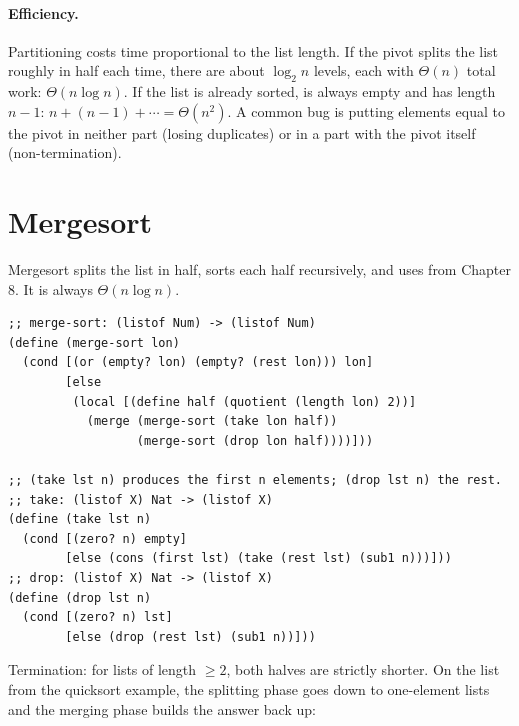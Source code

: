 \paragraph{Efficiency.} Partitioning costs time proportional to the list length.
If the pivot splits the list roughly in half each time, there are about
$\log_2 n$ levels, each with $\Theta(n)$ total work: $\Theta(n \log n)$. If the
list is already sorted,  is always empty and  has
length $n-1$: $n + (n-1) + \cdots = \Theta(n^2)$. A common bug is putting
elements equal to the pivot in neither part (losing duplicates) or in a part
with the pivot itself (non-termination).

\section{Mergesort}
Mergesort splits the list in half, sorts each half recursively, and uses
 from Chapter 8. It is always $\Theta(n \log n)$.
\begin{lstlisting}[style=racket]
;; merge-sort: (listof Num) -> (listof Num)
(define (merge-sort lon)
  (cond [(or (empty? lon) (empty? (rest lon))) lon]
        [else
         (local [(define half (quotient (length lon) 2))]
           (merge (merge-sort (take lon half))
                  (merge-sort (drop lon half))))]))

;; (take lst n) produces the first n elements; (drop lst n) the rest.
;; take: (listof X) Nat -> (listof X)
(define (take lst n)
  (cond [(zero? n) empty]
        [else (cons (first lst) (take (rest lst) (sub1 n)))]))
;; drop: (listof X) Nat -> (listof X)
(define (drop lst n)
  (cond [(zero? n) lst]
        [else (drop (rest lst) (sub1 n))]))
\end{lstlisting}
Termination: for lists of length $\ge 2$, both halves are strictly shorter.
On the list from the quicksort example, the splitting phase goes down to
one-element lists and the merging phase builds the answer back up:

